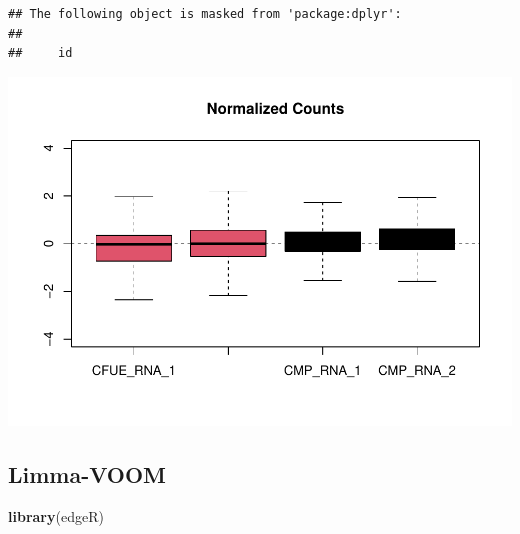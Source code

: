 \documentclass[
]{article}
\newenvironment{Shaded}{\begin{snugshade}}{\end{snugshade}}
\newcommand{\AttributeTok}[1]{\textcolor[rgb]{0.13,0.29,0.53}{#1}}
\newcommand{\ConstantTok}[1]{\textcolor[rgb]{0.56,0.35,0.01}{#1}}
\newcommand{\DecValTok}[1]{\textcolor[rgb]{0.00,0.00,0.81}{#1}}
\newcommand{\FunctionTok}[1]{\textcolor[rgb]{0.13,0.29,0.53}{\textbf{#1}}}
\newcommand{\NormalTok}[1]{#1}
\newcommand{\SpecialCharTok}[1]{\textcolor[rgb]{0.81,0.36,0.00}{\textbf{#1}}}
\newcommand{\StringTok}[1]{\textcolor[rgb]{0.31,0.60,0.02}{#1}}
\begin{document}
\begin{verbatim}
## The following object is masked from 'package:dplyr':
## 
##     id
\end{verbatim}

\begin{Shaded}
\end{Shaded}

\includegraphics{RNA_Analysis_23_files/figure-latex/diag plots-4.pdf}

\hypertarget{limma-voom}{%
\subsection{Limma-VOOM}\label{limma-voom}}

\begin{Shaded}
\begin{Highlighting}[]
\FunctionTok{library}\NormalTok{(edgeR)}
\end{Highlighting}
\end{Shaded}
\end{document}
